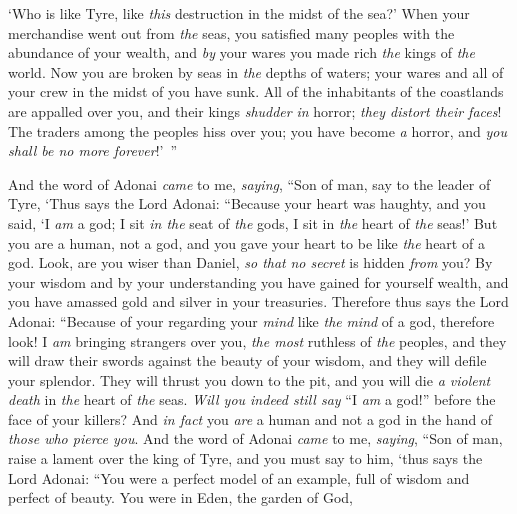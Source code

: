 \begin{biblechapter}
‘Who is like Tyre, 
like \textit{this} destruction in the midst of the sea?’
\verse When your merchandise went out from \textit{the} seas, 
you satisfied many peoples with the abundance of your wealth, 
and \textit{by} your wares 
you made rich \textit{the} kings of \textit{the} world.
\verse Now you are broken by seas 
in \textit{the} depths of waters; 
your wares and all of your crew 
in the midst of you have sunk.
\verse All of the inhabitants of the coastlands 
are appalled over you, 
and their kings \textit{shudder} \textit{in} horror; 
\textit{they distort their faces}!
\verse The traders among the peoples hiss over you; 
you have become \textit{a} horror, 
and \textit{you shall be no more forever}!’ ”
\end{biblechapter}

\begin{biblechapter} %
 And the word of Adonai \textit{came} to me, \textit{saying},
\verse “Son of man, say to the leader of Tyre, ‘Thus says the Lord Adonai:
\verse “Because your heart was haughty, 
and you said, ‘I \textit{am} a god; 
I sit \textit{in the} seat of \textit{the} gods, 
I sit in \textit{the} heart of \textit{the} seas!’ 
But you are a human, not a god, 
and you gave your heart to be like \textit{the} heart of a god.
\verse Look, are you wiser than Daniel, 
\textit{so that} \textit{no secret} is hidden \textit{from} you?
\verse By your wisdom and by your understanding 
you have gained for yourself wealth, 
and you have amassed gold and silver 
in your treasuries.
\verse Therefore thus says the Lord Adonai:
\verse “Because of your regarding your \textit{mind} 
like \textit{the} \textit{mind} of a god,
\verse therefore look! I \textit{am} bringing strangers over you, 
\textit{the most} ruthless of \textit{the} peoples, 
and they will draw their swords against the beauty of your wisdom, 
and they will defile your splendor.
\verse They will thrust you down to the pit, 
and you will die \textit{a violent death} 
in \textit{the} heart of \textit{the} seas.
\verse \textit{Will you indeed still say} “I \textit{am} a god!” 
before the face of your killers? 
And \textit{in fact} you \textit{are} a human and not a god 
in the hand of \textit{those who pierce you}.
\verse And the word of Adonai \textit{came} to me, \textit{saying},
\verse “Son of man, raise a lament over the king of Tyre, and you must say to him, ‘thus says the Lord Adonai:
\verse “You were a perfect model of an example, 
full of wisdom and perfect of beauty.
\verse You were in Eden, the garden of God, 

\end{biblechapter}
